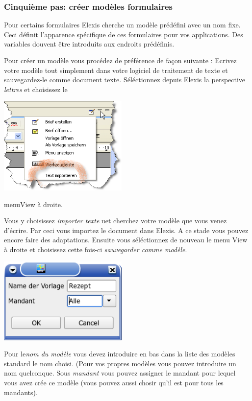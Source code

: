 \subsubsection{Cinquième pas: créer modèles formulaires}
Pour certains formulaires Elexis cherche un modèle prédéfini avec un nom fixe. Ceci définit l'apparence spécifique de ces formulaires pour vos applications. Des variables douvent être introduits aux endroits prédéfinis.

Pour créer un modèle vous procédez de préférence de façon suivante : Ecrivez votre modèle tout simplement dans votre logiciel de traitement de texte et sauvegardez-le comme document texte. Séléctionnez depuis Elexis la perspective \textit{lettres} et choisissez le


\includegraphics[width=2.5in]{images/import.png}

menuView à droite.

Vous y choisissez \textit{importer texte} uet cherchez votre modèle que vous venez d'écrire. Par ceci vous importez le document dans Elexis. A ce stade vous pouvez encore faire des adaptations. Ensuite vous séléctionnez de nouveau le menu View à droite et choisissez cette fois-ci  \textit{sauvegarder comme modèle}.

\includegraphics[width=2.5in]{images/rezept1.png}

Pour le\textit{nom du modèle} vous devez introduire en bas dans la liste des modèles standard le nom choisi. (Pour vos propres modèles vous pouvez introduire un nom quelconque. Sous \textit{mandant} vous pouvez assigner le mandant pour lequel vous avez crée ce modèle (vous pouvez aussi chosir qu'il est pour tous les mandants).

